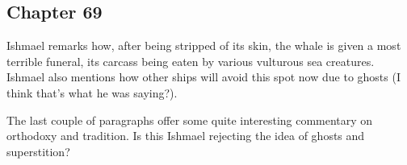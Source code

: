 \subsection{Chapter 69}

Ishmael remarks how, after being stripped of its skin, the whale is given a
most terrible funeral, its carcass being eaten by various vulturous sea
creatures. Ishmael also mentions how other ships will avoid this spot now due
to ghosts (I think that's what he was saying?).

The last couple of paragraphs offer some quite interesting commentary on
orthodoxy and tradition. Is this Ishmael rejecting the idea of ghosts and
superstition?
